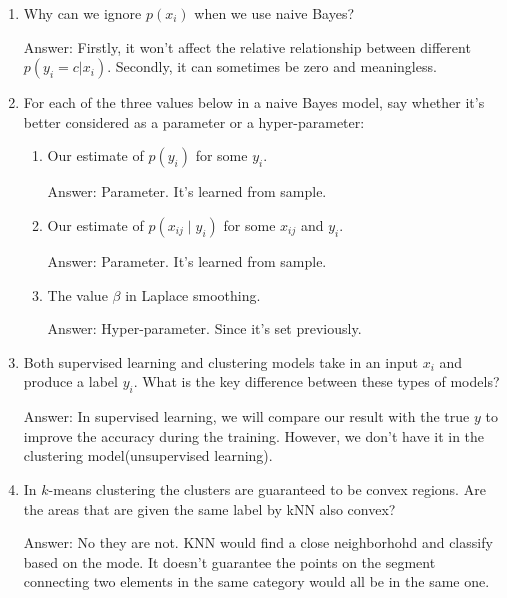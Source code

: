 \documentclass{article}
\newenvironment{answer}{\par\begingroup\color{gre}Answer: }{\endgroup}
\begin{document}
\begin{enumerate}
        \item Why can we ignore $p(x_i)$ when we use naive Bayes?
        \begin{answer}
            Firstly, it won't affect the relative relationship between different $p(y_i = c | x_i)$. Secondly, it can sometimes be zero and meaningless.
        \end{answer}

        \item For each of the three values below in a naive Bayes model, say whether it's better considered as a parameter or a hyper-parameter:
        \begin{enumerate}
            \item Our estimate of $p(y_i)$ for some $y_i$.
            \begin{answer}
                Parameter. It's learned from sample.
            \end{answer}
            \item Our estimate of $p(x_{ij} \mid y_i)$ for some $x_{ij}$ and $y_i$.
            \begin{answer}
                Parameter. It's learned from sample.
            \end{answer}
            \item The value $\beta$ in Laplace smoothing.
            \begin{answer}
                Hyper-parameter. Since it's set previously.
            \end{answer}
        \end{enumerate}

        \item Both supervised learning and clustering models take in an input $x_i$ and produce a label $y_i$. What is the key difference between these types of models?
        \begin{answer}
            In supervised learning, we will compare our result with the true $y$ to improve the accuracy during the training. However, we don't have it in the clustering model(unsupervised learning).
        \end{answer}

        \item In $k$-means clustering the clusters are guaranteed to be convex regions. Are the areas that are given the same label by kNN also convex?
        \begin{answer}
            No they are not. KNN would find a close neighborhohd and classify based on the mode. It doesn't guarantee the points on the segment connecting two elements in the same category would all be in the same one. 
        \end{answer}
    \end{enumerate}
\end{document}
